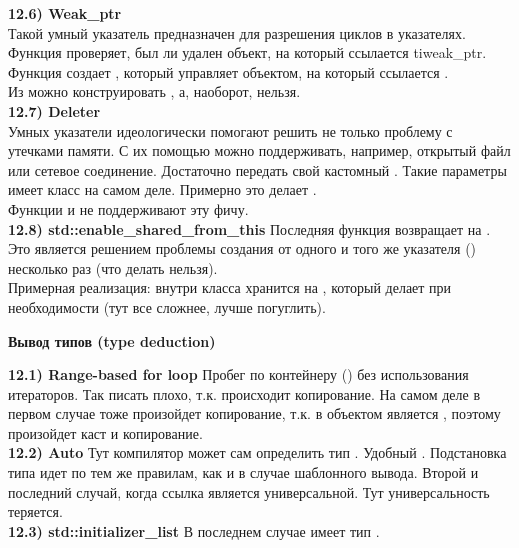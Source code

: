 \documentclass{article}
\begin{document}
\noindent \textbf{12.6) Weak\_ptr}\\
Такой умный указатель предназначен для разрешения циклов в указателях.
Функция  проверяет, был ли удален объект, на который ссылается ti{weak\_ptr}. Функция  создает , который управляет объектом, на который ссылается .\\
Из  можно конструировать , а, наоборот, нельзя.\\
\noindent \textbf{12.7) Deleter}\\
Умных указатели идеологически помогают решить не только проблему с утечками памяти. С их помощью можно поддерживать, например, открытый файл или сетевое соединение. Достаточно передать свой кастомный .
Такие параметры имеет класс  на самом деле.
Примерно это делает .\\
Функции  и  не поддерживают эту фичу.\\
\noindent \textbf{12.8) std::enable\_shared\_from\_this}
Последняя функция возвращает  на . Это является решением проблемы создания  от одного и того же указателя () несколько раз (что делать нельзя).\\
Примерная реализация: внутри класса  хранится  на , который делает  при необходимости (тут все сложнее, лучше погуглить).
\begin{center}
	\begin{large}
		\textbf{Вывод типов (type deduction)}
	\end{large}
\end{center}
\noindent \textbf{12.1) Range-based for loop}
Пробег по контейнеру () без использования итераторов.
Так писать плохо, т.к. происходит копирование. На самом деле в первом случае тоже произойдет копирование, т.к. в  объектом является , поэтому произойдет каст и копирование.\\
\noindent \textbf{12.2) Auto}
Тут компилятор может сам определить тип .	
Удобный .
Подстановка типа идет по тем же правилам, как и в случае шаблонного вывода.
Второй и последний случай, когда ссылка является универсальной.
Тут универсальность теряется.\\
\noindent \textbf{12.3) std::initializer\_list}
В последнем случае  имеет тип .
\end{document}
